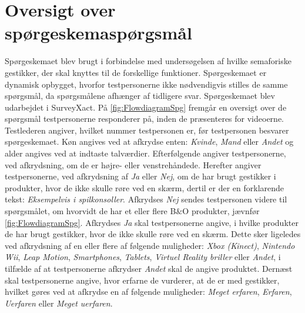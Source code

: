 \chapter{Oversigt over spørgeskemaspørgsmål}
\label{app:FlowdiagramSPG}
%
Spørgeskemaet blev brugt i forbindelse med undersøgelsen af hvilke semaforiske gestikker, der skal knyttes til de forskellige funktioner. Spørgeskemaet er dynamisk opbygget, hvorfor testpersonerne ikke nødvendigvis stilles de samme spørgsmål, da spørgsmålene afhænger af tidligere svar. Spørgeskemaet blev udarbejdet i SurveyXact.\blankline
%
På \autoref{fig:FlowdiagramSpg} fremgår en oversigt over de spørgsmål testpersonerne responderer på, inden de præsenteres for videoerne. Testlederen angiver, hvilket nummer testpersonen er, før testpersonen besvarer spørgeskemaet. Køn angives ved at afkrydse enten: \textit{Kvinde}, \textit{Mand} eller \textit{Andet} og alder angives ved at indtaste talværdier. Efterfølgende angiver testpersonerne, ved afkrydsning, om de er højre- eller venstrehåndede. Herefter angiver testpersonerne, ved afkrydsning af \textit{Ja} eller \textit{Nej}, om de har brugt gestikker i produkter, hvor de ikke skulle røre ved en skærm, dertil er der en forklarende tekst: \textit{Eksempelvis i spilkonsoller}. Afkrydses \textit{Nej} sendes testpersonen videre til spørgsmålet, om hvorvidt de har et eller flere B$\&$O produkter, jævnfør \autoref{fig:FlowdiagramSpg}. Afkrydses \textit{Ja} skal testpersonerne angive, i hvilke produkter de har brugt gestikker, hvor de ikke skulle røre ved en skærm. Dette sker ligeledes ved afkrydsning af en eller flere af følgende muligheder: \textit{Xbox (Kinect)}, \textit{Nintendo Wii}, \textit{Leap Motion}, \textit{Smartphones}, \textit{Tablets}, \textit{Virtuel Reality briller} eller \textit{Andet}, i tilfælde af at testpersonerne afkrydser \textit{Andet} skal de angive produktet. Dernæst skal testpersonerne angive, hvor erfarne de vurderer, at de er med gestikker, hvilket gøres ved at afkrydse en af følgende muligheder: \textit{Meget erfaren}, \textit{Erfaren}, \textit{Uerfaren} eller \textit{Meget uerfaren}. 

